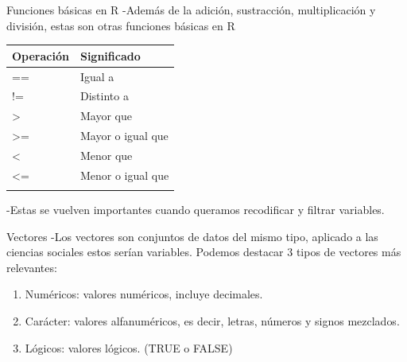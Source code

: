 \documentclass[
  30pt,
  ignorenonframetext,
]{beamer}
\begin{document}
\begin{frame}{Funciones básicas en R}
\label{funciones-buxe1sicas-en-r-1}
-Además de la adición, sustracción, multiplicación y división, estas son
otras funciones básicas en R

\begin{longtable}[]{@{}ll@{}}
\toprule\noalign{}
Operación & Significado \\
\midrule\noalign{}
\endhead
== & Igual a \\
!= & Distinto a \\
\textgreater{} & Mayor que \\
\textgreater= & Mayor o igual que \\
\textless{} & Menor que \\
\textless= & Menor o igual que \\
\bottomrule\noalign{}
\end{longtable}

-Estas se vuelven importantes cuando queramos recodificar y filtrar
variables.
\end{frame}

\begin{frame}{Vectores}
\label{vectores}
-Los vectores son conjuntos de datos del mismo tipo, aplicado a las
ciencias sociales estos serían variables. Podemos destacar 3 tipos de
vectores más relevantes:

\begin{enumerate}
\item
  Numéricos: valores numéricos, incluye decimales.
\item
  Carácter: valores alfanuméricos, es decir, letras, números y signos
  mezclados.
\item
  Lógicos: valores lógicos. (TRUE o FALSE)
\end{enumerate}
\end{frame}
\end{document}
